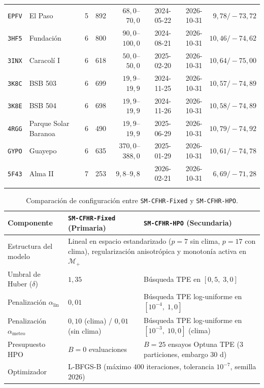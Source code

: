 \begin{table}[!htbp]
\begin{tabular}{@{}clrrrrrr@{}}
\texttt{EPFV} & El Paso & 5 & 892 & $68{,}0$--$70{,}0$ & 2024-05-22 & 2026-10-31 & $9{,}78 / -73{,}72$ \\
\texttt{3HF5} & Fundación & 6 & 800 & $90{,}0$--$100{,}0$ & 2024-08-21 & 2026-10-31 & $10{,}46 / -74{,}62$ \\
\texttt{3INX} & Caracolí I & 6 & 618 & $50{,}0$--$50{,}0$ & 2025-02-20 & 2026-10-31 & $10{,}64 / -75{,}00$ \\
\texttt{3K8C} & BSB 503 & 6 & 699 & $19{,}9$--$19{,}9$ & 2024-11-25 & 2026-10-31 & $10{,}57 / -74{,}89$ \\
\texttt{3K8E} & BSB 504 & 6 & 698 & $19{,}9$--$19{,}9$ & 2024-11-26 & 2026-10-31 & $10{,}58 / -74{,}89$ \\
\texttt{4RGG} & Parque Solar Baranoa & 6 & 490 & $19{,}9$--$19{,}9$ & 2025-06-29 & 2026-10-31 & $10{,}79 / -74{,}92$ \\
\texttt{GYPO} & Guayepo & 6 & 635 & $370{,}0$--$388{,}0$ & 2025-01-29 & 2026-10-31 & $10{,}61 / -74{,}78$ \\
\texttt{5F43} & Alma II & 7 & 253 & $9{,}8$--$9{,}8$ & 2026-02-21 & 2026-10-31 & $6{,}69 / -71{,}28$ \\
\botrule
\end{tabular}
\end{table}

\begin{table}[!htbp]
\caption{Comparación de configuración entre \texttt{SM-CFHR-Fixed} y \texttt{SM-CFHR-HPO}.}\label{tab:config_fixed_hpo}
\scriptsize
\setlength{\tabcolsep}{3pt}
\begin{tabular}{@{}p{2.5cm}p{4.2cm}p{4.7cm}@{}}
\toprule
Componente & \texttt{SM-CFHR-Fixed} (Primaria) & \texttt{SM-CFHR-HPO} (Secundaria) \\
\midrule
Estructura del modelo & \multicolumn{2}{p{9.1cm}}{Lineal en espacio estandarizado ($p=7$ sin clima, $p=17$ con clima), regularización anisotrópica y monotonía activa en $\mathcal{M}_+$} \\
Umbral de Huber ($\delta$) & $1{,}35$ & Búsqueda TPE en $[0{,}5,\; 3{,}0]$ \\
Penalización $\alpha_{\mathrm{lin}}$ & $0{,}01$ & Búsqueda TPE log-uniforme en $[10^{-4},\; 1{,}0]$ \\
Penalización $\alpha_{\mathrm{meteo}}$ & $0{,}10$ (clima) / $0{,}01$ (sin clima) & Búsqueda TPE log-uniforme en $[10^{-3},\; 10{,}0]$ (clima) \\
Presupuesto HPO & $B = 0$ evaluaciones & $B = 25$ ensayos Optuna TPE ($3$ particiones, embargo $30\text{ d}$) \\
Optimizador & \multicolumn{2}{p{9.1cm}}{L-BFGS-B (máximo $400$ iteraciones, tolerancia $10^{-7}$, semilla $2026$)} \\
\bottomrule
\end{tabular}
\end{table}

